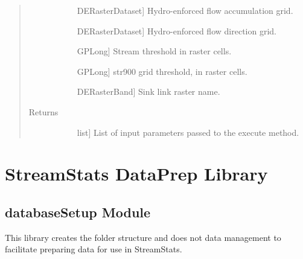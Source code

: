 \documentclass[letterpaper,10pt,english]{sphinxmanual}
\begin{document}
\begin{fulllineitems}
\begin{fulllineitems}
\begin{quote}
\begin{description}
\begin{description}
\item[{}] \leavevmode{[}DERasterDataset{]}
Hydro-enforced flow accumulation grid.

\item[{}] \leavevmode{[}DERasterDataset{]}
Hydro-enforced flow direction grid.

\item[{}] \leavevmode{[}GPLong{]}
Stream threshold in raster cells.

\item[{}] \leavevmode{[}GPLong{]}
str900 grid threshold, in raster cells.

\item[{}] \leavevmode{[}DERasterBand{]}
Sink link raster name.

\end{description}

\item[{Returns}] \leavevmode\begin{description}
\item[{}] \leavevmode{[}list{]}
List of input parameters passed to the execute method.

\end{description}

\end{description}\end{quote}

\end{fulllineitems}


\end{fulllineitems}



\section{StreamStats DataPrep Library}
\label{\detokenize{modules:streamstats-dataprep-library}}\label{\detokenize{modules::doc}}

\subsection{databaseSetup Module}
\label{\detokenize{databaseSetup:module-databaseSetup}}\label{\detokenize{databaseSetup:databasesetup-module}}\label{\detokenize{databaseSetup::doc}}
This library creates the folder structure and does not data management to facilitate preparing data for use in StreamStats.
\end{document}
